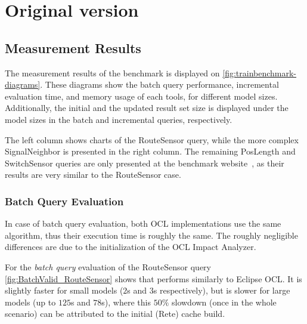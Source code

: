 \section{Original version}


\subsection{Measurement Results}
\label{sec:results}

The measurement results of the benchmark is displayed on
\autoref{fig:trainbenchmark-diagrams}. These diagrams show the batch query
performance, incremental evaluation time, and memory usage of each tools, for
different model sizes. Additionally, the initial and the updated result set size
is displayed under the model sizes in the batch and incremental queries,
respectively.

The left column shows charts of the \textsf{RouteSensor} query,
while the more complex \textsf{SignalNeighbor} is presented in the right column.
The remaining \textsf{PosLength} and \textsf{SwitchSensor} queries are only presented
at the benchmark website~\cite{TBwebsite}, as their results are very similar to the
\textsf{RouteSensor} case.

\subsubsection{Batch Query Evaluation}
In case of batch query evaluation, both OCL implementations use the same
algorithm, thus their execution time is roughly the same. The roughly negligible
differences are due to the initialization of the OCL Impact Analyzer.

For the \emph{batch query} evaluation of the \textsf{RouteSensor} query
\autoref{fig:BatchValid_RouteSensor} shows that \incquery{} performs similarly
to Eclipse OCL. It is slightly faster for small models ($2$s and $3$s
respectively), but is slower for large models (up to $125$s and $78$s), where
this $50\%$ slowdown (once in the whole scenario) can be attributed to the
initial (Rete) cache build.


